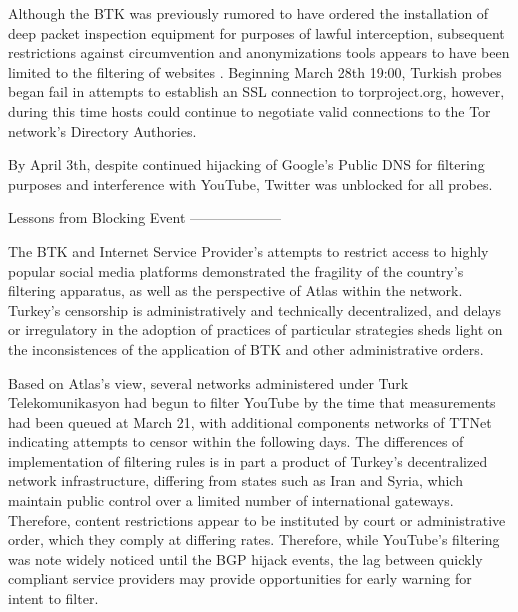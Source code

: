 Although the BTK was previously rumored to have ordered the installation of deep packet inspection equipment for purposes of lawful interception, subsequent restrictions against circumvention and anonymizations tools appears to have been limited to the filtering of websites \cite{kirlidog2011deep}. Beginning March 28th 19:00, Turkish probes began fail in attempts to establish an SSL connection to torproject.org, however, during this time hosts could continue to negotiate valid connections to the Tor network's Directory Authories.

By April 3th, despite continued hijacking of Google's Public DNS for filtering purposes and interference with YouTube, Twitter was unblocked for all probes.

Lessons from Blocking Event
--------------------

The BTK and Internet Service Provider's attempts to restrict access to highly popular social media platforms demonstrated the fragility of the country's filtering apparatus, as well as the perspective of Atlas within the network. Turkey's censorship is administratively and technically decentralized, and delays or irregulatory in the adoption of practices of particular strategies sheds light on the inconsistences of the application of BTK and other administrative orders.

Based on Atlas's view, several networks administered under Turk Telekomunikasyon had begun to filter YouTube by the time that measurements had been queued at March 21, with additional components networks of TTNet indicating attempts to censor within the following days. The differences of implementation of filtering rules is in part a product of Turkey's decentralized network infrastructure, differing from states such as Iran and Syria, which maintain public control over a limited number of international gateways. Therefore, content restrictions appear to be instituted by court or administrative order, which they comply at differing rates. Therefore, while YouTube's filtering was note widely noticed until the BGP hijack events, the lag between quickly compliant service providers may provide opportunities for early warning for intent to filter.

